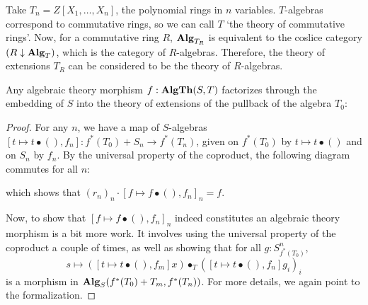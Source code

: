\begin{example}
  Take $ T_n = Z[X_1, \dots, X_n] $, the polynomial rings in $ n $ variables. $ T $-algebras correspond to commutative rings, so we can call $ T $ `the theory of commutative rings'. Now, for a commutative ring $ R $, $ \mathbf{Alg}_{T_R} $ is equivalent to the coslice category $ (R \downarrow \mathbf{Alg}_{T}) $, which is the category of $ R $-algebras. Therefore, the theory of extensions $ T_R $ can be considered to be the theory of $ R $-algebras.
\end{example}

\begin{lemma}\label{lem:factor-through-extensions}
  Any algebraic theory morphism $ f: \mathbf{AlgTh}(S, T) $ factorizes through the embedding of $ S $ into the theory of extensions of the pullback of the algebra $ T_0 $:
  \begin{center}
  \end{center}
\end{lemma}
\begin{proof}
  For any $ n $, we have a map of $ S $-algebras $ [t \mapsto t \bullet (), f_n] : f^*(T_0) + S_n \to f^*(T_n) $, given on $ f^*(T_0) $ by $ t \mapsto t \bullet () $ and on $ S_n $ by $ f_n $. By the universal property of the coproduct, the following diagram commutes for all $ n $:
  \begin{center}
  \end{center}
  which shows that $ (r_n)_n \cdot [f \mapsto f \bullet (), f_n]_n = f $.

  Now, to show that $ [f \mapsto f \bullet (), f_n]_n $ indeed constitutes an algebraic theory morphism is a bit more work. It involves using the universal property of the coproduct a couple of times, as well as showing that for all $ g : S_{f^*(T_0)}^n $,
  \[ s \mapsto ([t \mapsto t \bullet (), f_m] x) \bullet_T ([t \mapsto t \bullet (), f_n] g_i)_i \]
  is a morphism in $ \mathbf{Alg}_{S}(f^*(T_0) + T_m, f^*(T_n)) $. For more details, we again point to the formalization.
\end{proof}


